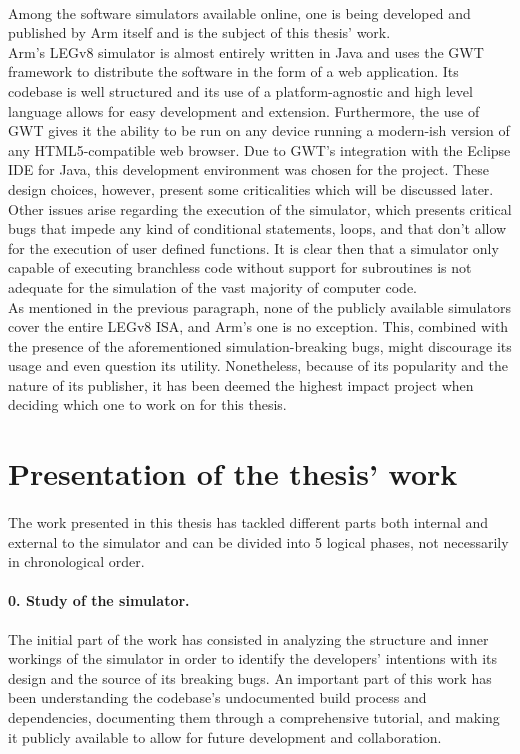 \paragraph{}
Among the software simulators available online, one is being developed and published by Arm itself \cite{legv8simARMrepo} and is the subject of this thesis' work. \\
Arm's LEGv8 simulator is almost entirely written in Java and uses the GWT framework \cite{gwtweb} to distribute the software in the form of a web application. Its codebase is well structured and its use of a platform-agnostic and high level language allows for easy development and extension. Furthermore, the use of GWT gives it the ability to be run on any device running a modern-ish version of any HTML5-compatible web browser. Due to GWT's integration with the Eclipse IDE for Java, this development environment was chosen for the project. These design choices, however, present some criticalities which will be discussed later. \\
Other issues arise regarding the execution of the simulator, which presents critical bugs that impede any kind of conditional statements, loops, and that don't allow for the execution of user defined functions. It is clear then that a simulator only capable of executing branchless code without support for subroutines is not adequate for the simulation of the vast majority of computer code. \\
As mentioned in the previous paragraph, none of the publicly available simulators cover the entire LEGv8 ISA, and Arm's one is no exception. This, combined with the presence of the aforementioned simulation-breaking bugs, might discourage its usage and even question its utility. Nonetheless, because of its popularity and the nature of its publisher, it has been deemed the highest impact project when deciding which one to work on for this thesis. 

\section*{Presentation of the thesis' work}
\paragraph{}
The work presented in this thesis has tackled different parts both internal and external to the simulator and can be divided into 5 logical phases, not necessarily in chronological order.

\paragraph{0. Study of the simulator.}
The initial part of the work has consisted in analyzing the structure and inner workings of the simulator in order to identify the developers' intentions with its design and the source of its breaking bugs. An important part of this work has been understanding the codebase's undocumented build process and dependencies, documenting them through a comprehensive tutorial, and making it publicly available to allow for future development and collaboration.

